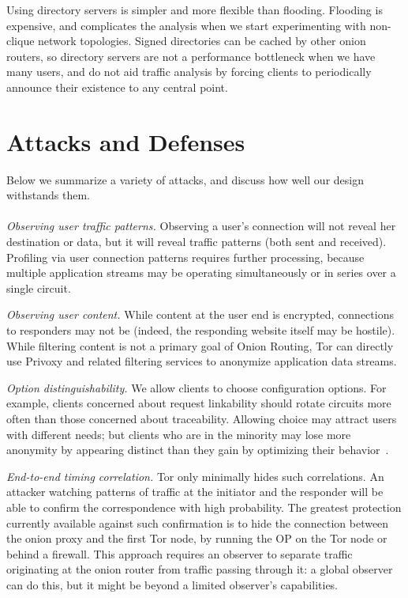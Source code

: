 \documentclass[twocolumn]{article}
\begin{document}
Using directory servers is simpler and more flexible than flooding.
Flooding is expensive, and complicates the analysis when we
start experimenting with non-clique network topologies. Signed
directories can be cached by other
onion routers,
so directory servers are not a performance
bottleneck when we have many users, and do not aid traffic analysis by
forcing clients to periodically announce their existence to any
central point.

\section{Attacks and Defenses}
\label{sec:attacks}

Below we summarize a variety of attacks, and discuss how well our
design withstands them.\\

\\
\emph{Observing user traffic patterns.} Observing a user's connection
will not reveal her destination or data, but it will
reveal traffic patterns (both sent and received). Profiling via user
connection patterns requires further processing, because multiple
application streams may be operating simultaneously or in series over
a single circuit.

\emph{Observing user content.} While content at the user end is encrypted,
connections to responders may not be (indeed, the responding website
itself may be hostile). While filtering content is not a primary goal
of Onion Routing, Tor can directly use Privoxy and related
filtering services to anonymize application data streams.

\emph{Option distinguishability.} We allow clients to choose
configuration options. For example, clients concerned about request
linkability should rotate circuits more often than those concerned
about traceability. Allowing choice may attract users with different 
needs; but clients who are
in the minority may lose more anonymity by appearing distinct than they
gain by optimizing their behavior~\cite{econymics}.

\emph{End-to-end timing correlation.}  Tor only minimally hides
such correlations. An attacker watching patterns of
traffic at the initiator and the responder will be
able to confirm the correspondence with high probability. The
greatest protection currently available against such confirmation is to hide
the connection between the onion proxy and the first Tor node,
by running the OP on the Tor node or behind a firewall. This approach
requires an observer to separate traffic originating at the onion
router from traffic passing through it: a global observer can do this,
but it might be beyond a limited observer's capabilities.
\end{document}
